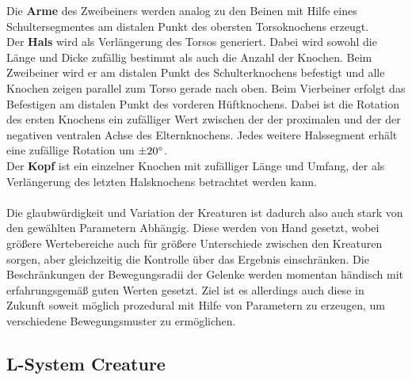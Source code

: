 Die \textbf{Arme} des Zweibeiners werden analog zu den Beinen mit Hilfe eines Schultersegmentes am distalen Punkt des obersten Torsoknochens erzeugt.\\
Der \textbf{Hals} wird als Verlängerung des Torsos generiert. Dabei wird sowohl die Länge und Dicke zufällig bestimmt als auch die Anzahl der Knochen. Beim Zweibeiner wird er am distalen Punkt des Schulterknochens befestigt und alle Knochen zeigen parallel zum Torso gerade nach oben. Beim Vierbeiner erfolgt das Befestigen am distalen Punkt des vorderen Hüftknochens. Dabei ist die Rotation des ersten Knochens ein zufälliger Wert zwischen der der proximalen und der der negativen ventralen Achse des Elternknochens. Jedes weitere Halssegment erhält eine zufällige Rotation um $\pm 20\degree$.\\
Der \textbf{Kopf} ist ein einzelner Knochen mit zufälliger Länge und Umfang, der als Verlängerung des letzten Halsknochens betrachtet werden kann.\\
\\
Die glaubwürdigkeit und Variation der Kreaturen ist dadurch also auch stark von den gewählten Parametern Abhängig. Diese werden von Hand gesetzt, wobei größere Wertebereiche auch für größere Unterschiede zwischen den Kreaturen sorgen, aber gleichzeitig die Kontrolle über das Ergebnis einschränken. Die Beschränkungen der Bewegungsradii der Gelenke werden momentan händisch mit erfahrungsgemäß guten Werten gesetzt. Ziel ist es allerdings auch diese in Zukunft soweit möglich prozedural mit Hilfe von Parametern zu erzeugen, um verschiedene Bewegungsmuster zu ermöglichen.




\subsection{L-System Creature}




